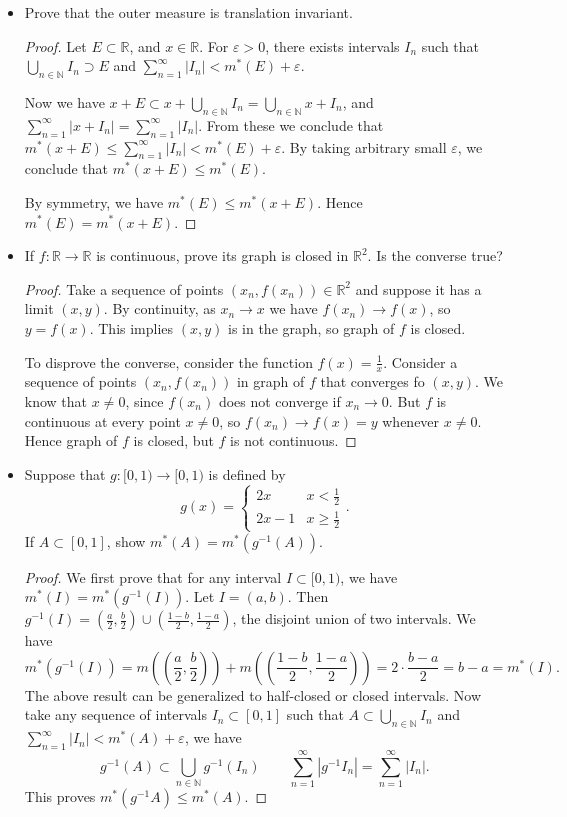 \begin{itemize}
\item Prove that the outer measure is translation invariant.
\begin{proof}
	Let $E \subset \mathbb{R}$, and $x \in \mathbb{R}$. For $\varepsilon>0$, there exists intervals $I_n$ such that $\bigcup_{n \in \mathbb{N}} I_n \supset E$ and $\sum_{n=1}^{\infty} |I_n| < m^*(E) + \varepsilon$. 

	 Now we have  $x + E \subset x + \bigcup_{n \in \mathbb{N}} I_n = \bigcup_{n \in \mathbb{N}}  x + I_n$, and $\sum_{n=1}^{\infty} |x+I_n| = \sum_{n=1}^{\infty} |I_n|$. From these we conclude that $m^*(x + E) \le \sum_{n=1}^{\infty} |I_n| < m^*(E ) + \varepsilon$. By taking arbitrary small $\varepsilon$, we conclude that $m^*(x + E) \le  m^*(E)$.

	 By symmetry, we have $m^*(E) \le m^*(x + E)$. Hence $m^*(E) = m^*(x + E)$.
\end{proof}

\item If $f : \mathbb{R}\to \mathbb{R}$ is continuous, prove its graph is closed in $\mathbb{R}^2$. Is the converse true?
\begin{proof}
	Take a sequence of points $(x_n, f(x_{n})) \in \mathbb{R}^2$ and suppose it has a limit $(x, y)$. By continuity, as $x_n \to x$ we have $f(x_n) \to f(x)$, so $y = f(x)$. This implies $(x,y)$ is in the graph, so graph of $f$ is closed.

	To disprove the converse, consider the function $f(x) = \frac{1}{x}$. Consider a sequence of points $(x_n, f(x_n))$ in graph of $f$ that converges fo $(x,y)$. We know that $x \neq 0$, since $f(x_n)$ does not converge if $x_n \to 0$. But $f$ is continuous at every point $x \neq 0$, so $f(x_n) \to  f(x) = y$ whenever $x \neq 0$. Hence graph of $f$ is closed, but $f$ is not continuous.
\end{proof}

\item Suppose that $g:[0,1) \to [0,1)$ is defined by
	\[
		g(x) = \begin{cases}
			2x & x<\frac{1}{2}\\
			2x-1 & x\ge \frac{1}{2}
		\end{cases}
	.\] 
	If $A \subset [0,1]$, show $m^*(A) = m^*(g^{-1} (A))$.
\begin{proof}
	We first prove that for any interval $I \subset [0,1)$, we have $m^*(I) = m^*(g^{-1} (I))$. Let $I = (a,b)$. Then $g^{-1} (I) = \left(\frac{a}{2}, \frac{b}{2}\right) \cup \left( \frac{1-b}{2}, \frac{1-a}{2} \right) $, the disjoint union of two intervals. We have
	\[
		m^*(g^{-1} (I)) = m\left( \left(\frac{a}{2}, \frac{b}{2}\right) \right)  + m\left( \left(  \frac{1-b}{2}, \frac{1-a}{2}\right)  \right)  = 2 \cdot \frac{b-a}{2} = b-a = m^*(I)
	.\] 
	The above result can be generalized to half-closed or closed intervals. Now take any sequence of intervals $I_n \subset [0,1]$ such that $A \subset \bigcup_{n \in \mathbb{N}} I_n$ and $\sum_{n=1}^{\infty} |I_n| < m^*(A) + \varepsilon$, we have
	\[
		g^{-1} (A) \subset \bigcup_{n \in \mathbb{N}} g^{-1} (I_n) \qquad \sum_{n=1}^{\infty} |g^{-1} I_n| = \sum_{n=1}^{\infty} |I_n|
	.\] 
	This proves $m^*(g^{-1} A) \le m^*(A)$.


\end{proof}
\end{itemize}
